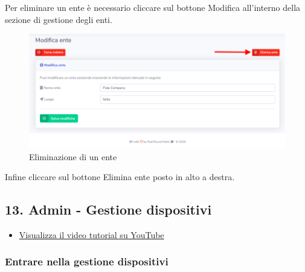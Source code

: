 		Per eliminare un ente è necessario cliccare sul bottone Modifica all'interno della sezione di gestione degli enti.

		\begin{figure}[H]
		\centering
		\includegraphics[scale=0.600]{res/images/admin/elimEnte.png}
		\caption{Eliminazione di un ente}
	\end{figure}


		Infine cliccare sul bottone Elimina ente posto in alto a destra.

	

\newpage \subsection{13. Admin - Gestione dispositivi}

	\begin{itemize}
		\item \href{https://www.youtube.com/watch?v=PjySMOLCtMA&list=PLPKYjnuIh1FA3b3jn_bwY_ztYzaFn2mIT&index=16}{Visualizza il video tutorial su YouTube} 
	\end{itemize}

	\subsubsection{Entrare nella gestione dispositivi}

